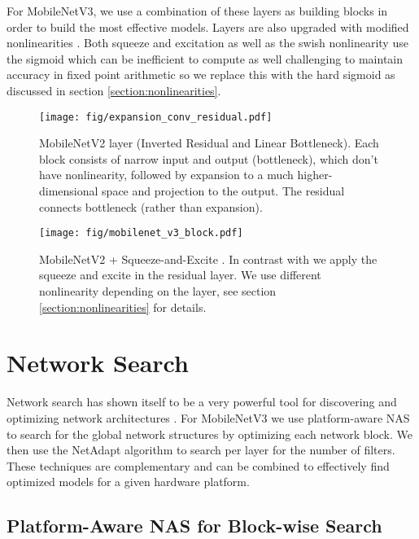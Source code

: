 \documentclass[10pt,twocolumn,letterpaper]{article}
\begin{document}
For MobileNetV3, we use a combination of these layers as building blocks in order to build the most effective models. Layers are also upgraded with modified  nonlinearities \cite{swish, silu, gelu}. Both squeeze and excitation as well as the swish nonlinearity use the sigmoid which can be inefficient to compute as well challenging to maintain accuracy in fixed point arithmetic so we replace this with the hard sigmoid \cite{hard-swish,binaryconnect} as discussed in section \ref{section:nonlinearities}.
\begin{figure}[!t]
    \centering
    \texttt{[image: fig/expansion\_conv\_residual.pdf]}
    \caption{MobileNetV2 \cite{mobilenetv2} layer (Inverted Residual and Linear Bottleneck).
    Each block consists of narrow input and output (bottleneck),
    which don't have nonlinearity, followed by expansion to a much higher-dimensional space and
    projection to the output.
    The residual connects bottleneck (rather than expansion).}
    \label{fig:expansion_conv_v2}
\end{figure}

\begin{figure}[!t]
    \centering
    \texttt{[image: fig/mobilenet\_v3\_block.pdf]}
    \caption{MobileNetV2 + Squeeze-and-Excite \cite{squeezeandexcite}. In contrast with \cite{squeezeandexcite} we apply the squeeze and excite in the residual layer.  We use different nonlinearity depending on the layer, see section \ref{section:nonlinearities} for details.}
    \label{fig:expansion_conv_v3}
\end{figure}


\section{Network Search}
\label{section:search}
Network search has shown itself to be a very powerful tool for discovering and optimizing network architectures \cite{NAS_reinforcement, mnasnet, proxyless, NetAdapt}. For MobileNetV3 we use platform-aware NAS to search for the global network structures by optimizing each network block. We then use the NetAdapt algorithm to search per layer for the number of filters. These techniques are complementary and can be combined to effectively find optimized models for a given hardware platform.   

\subsection{Platform-Aware NAS for Block-wise Search}
\end{document}

